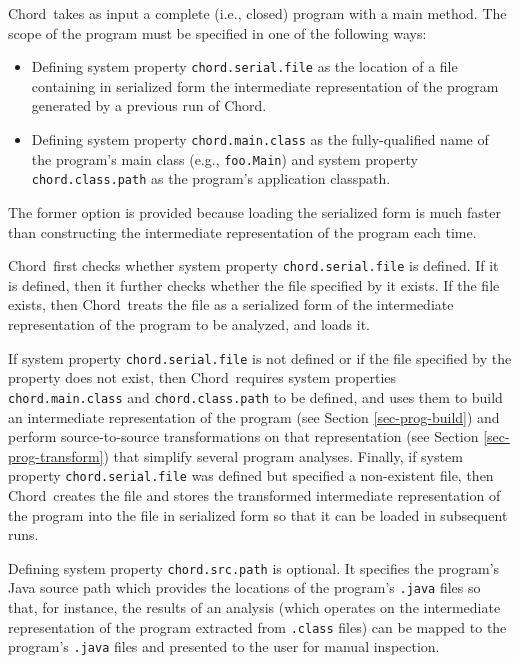 \documentclass{article}
\providecommand\Chord{{Chord}}
\begin{document}
\Chord\ takes as input a complete (i.e., closed) program with a main method.
The scope of the program must be specified in one of the
following ways:

\begin{itemize}
\item
Defining system property {\tt chord.serial.file} as
the location of a file containing in serialized form the intermediate representation
of the program generated by a previous run of \Chord.
\item
Defining system property {\tt chord.main.class} as the fully-qualified name
of the program's main class (e.g., {\tt foo.Main}) and system property
{\tt chord.class.path} as the program's application classpath.
\end{itemize}

The former option is provided because loading the serialized form
is much faster than constructing the intermediate representation
of the program each time.

\Chord\ first checks whether system property {\tt chord.serial.file} is defined.
If it is defined, then it further checks whether the file specified by it
exists.
If the file exists, then \Chord\ treats the file as a serialized form of
the intermediate representation of the program to be analyzed, and loads it.

If system property {\tt chord.serial.file} is not defined or if the file
specified by the property does not exist, then \Chord\ requires system properties
{\tt chord.main.class} and {\tt chord.class.path} 
to be defined, and uses them to
build an intermediate representation of the program (see Section \ref{sec-prog-build})
and perform source-to-source transformations on that representation
(see Section \ref{sec-prog-transform}) that simplify several program analyses.
Finally, if system property {\tt chord.serial.file} was defined but
specified a non-existent file, then \Chord\ creates the file and stores the
transformed intermediate representation of the program into the file in
serialized form so that it can be loaded in subsequent runs.

Defining system property {\tt chord.src.path} is optional.
It specifies the program's Java source path which provides the
locations of the program's {\tt .java} files so that, for instance, the
results of an analysis (which operates on the intermediate representation of
the program extracted from {\tt .class} files) can be mapped to the
program's {\tt .java} files and presented to the user for
manual inspection.
\end{document}
